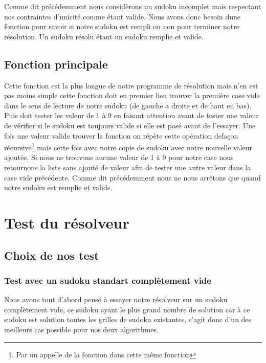 Comme dit précédemment nous considèrons un sudoku incomplet mais respectant nos contraintes d'unicité comme étant valide. Nous avons donc besoin dune fonction pour savoir si notre sudoku est rempli ou non pour terminer notre résolution. Un sudoku résolu étant un sudoku remplie et valide.\newline

\subsection{Fonction principale}

Cette fonction est la plus longue de notre programme de résolution mais n'en est pas moins simple cette fonction doit en premier lieu trouver la première case vide dans le sens de lecture de notre sudoku (de gauche a droite et de haut en bas).\newline
Puis doit tester les valeur de 1 à 9 en faisant attention avant de tester une valeur de vérifier si le sudoku est toujours valide si elle est posé avant de l'essayer.\newline
Une fois une valeur valide trouver la fonction on répète cette opération defaçon récursive\footnote{Par un appelle de la fonction dans cette même fonction} mais cette fois avec notre copie de sudoku avec notre nouvelle valeur ajoutée.\newline
Si nous ne trouvons aucune valeur de 1 à 9 pour notre case nous retournons la liste sans ajouté de valeur afin de tester une autre valeur dans la case vide précédente.\newline
Comme dit précédemment nous ne nous arrêtons que quand notre sudoku est remplie et valide.\newline

\section{Test du résolveur}

\subsection{Choix de nos test}

\subsubsection{Test avec un sudoku standart complètement vide}

Nous avons tout d'abord pensé à essayer notre résolveur sur un sudoku complètement vide, ce sudoku ayant le plus grand nombre de solution car à ce sudoku est solution toutes les grilles de sudoku existantes, s'agit donc d'un des meilleurs cas possible pour nos deux algorithmes.

